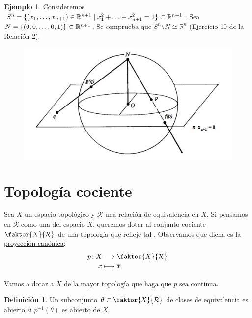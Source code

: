 \documentclass[12pt]{report}
\theoremstyle{definition}
\newtheorem{definition}{Definición}[chapter]
\theoremstyle{definition}
\newtheorem{example}{Ejemplo}[chapter]
\theoremstyle{remark}
\newcommand{\R}{\mathbb R}
\begin{document}
\begin{example}
\label{ex1.25.}
Consideremos $S^n = \{(x_1,\mathellipsis,x_{n+1}) \in \R^{n+1} \mid x_1^2 + \mathellipsis + x_{n+1}^2 = 1\} \subset \R^{n+1}$. Sea $N = \{(0,0,\mathellipsis,0,1)\} \subset \R^{n+1}$. Se comprueba que $S^n \setminus N \cong \R^n$ (Ejercicio 10 de la Relación 2).

\begin{figure}[h]
\includegraphics[scale = 0.8]{ex1.25}
\centering
\end{figure}

\end{example}

\section{Topología cociente}

Sea $X$ un espacio topológico y $\mathcal{R}$ una relación de equivalencia en $X$. Si pensamos en $\mathcal{R}$ como una  del espacio $X$, queremos dotar al conjunto cociente $\faktor{X}{\mathcal{R}}$ de una topología que refleje tal . Observamos que dicha  es la \underline{proyección canónica}: 
\[
\begin{aligned}[t]
    p \colon X & \longrightarrow \faktor{X}{\mathcal{R}} \\
    x & \longmapsto \overline{x}
\end{aligned}
\]

Vamos a dotar a $X$ de la mayor topología que haga que $p$ sea continua.

\begin{definition}
Un subconjunto $\theta \subset \faktor{X}{\mathcal{R}}$ de clases de equivalencia es \underline{abierto} si $p^{-1}(\theta)$ es abierto de $X$.
\end{definition}
\end{document}
